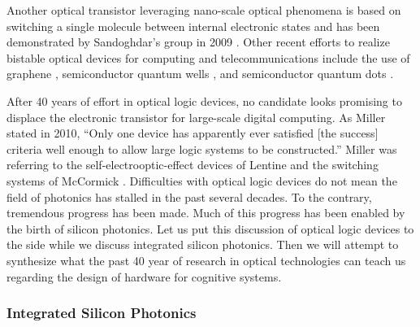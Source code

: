 Another optical transistor leveraging nano-scale optical phenomena is based on switching a single molecule between internal electronic states and has been demonstrated by Sandoghdar's group in 2009 \cite{hwpo2009}. Other recent efforts to realize bistable optical devices for computing and telecommunications include the use of graphene \cite{wawu2016,guru2017}, semiconductor quantum wells \cite{suzh2019,saeb2018}, and semiconductor quantum dots \cite{lili2019}. 

After 40 years of effort in optical logic devices, no candidate looks promising to displace the electronic transistor for large-scale digital computing. As Miller stated in 2010, ``Only one device has apparently ever satisfied [the success] criteria well enough to allow large logic systems to be constructed.'' \cite{mi2010} Miller was referring to the self-electrooptic-effect devices of Lentine \cite{lehi1989} and the switching systems of McCormick \cite{mccl1993}. Difficulties with optical logic devices do not mean the field of photonics has stalled in the past several decades. To the contrary, tremendous progress has been made. Much of this progress has been enabled by the birth of silicon photonics. Let us put this discussion of optical logic devices to the side while we discuss integrated silicon photonics. Then we will attempt to synthesize what the past 40 year of research in optical technologies can teach us regarding the design of hardware for cognitive systems.


\subsubsection{\label{sec:integrated_silicon_photonics}Integrated Silicon Photonics}

